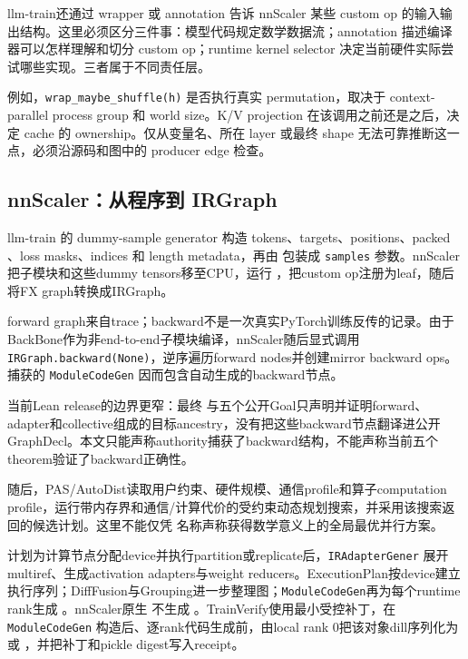 \documentclass[10.5pt,a4paper]{ctexart}
\newcommand{\code}[1]{\texttt{#1}}
\begin{document}
llm-train还通过 wrapper 或 annotation 告诉 nnScaler 某些 custom op 的输入输出结构。这里必须区分三件事：模型代码规定数学数据流；annotation 描述编译器可以怎样理解和切分 custom op；runtime kernel selector 决定当前硬件实际尝试哪些实现。三者属于不同责任层。

例如，\code{wrap\_maybe\_shuffle(h)} 是否执行真实 permutation，取决于 context-parallel process group 和 world size。K/V projection 在该调用之前还是之后，决定 cache 的 ownership。仅从变量名、所在 layer 或最终 shape 无法可靠推断这一点，必须沿源码和图中的 producer edge 检查。

\subsection{nnScaler：从程序到 IRGraph}

llm-train 的 dummy-sample generator 构造 tokens、targets、positions、packed 、loss masks、indices 和 length metadata，再由  包装成 \code{samples} 参数。nnScaler把子模块和这些dummy tensors移至CPU，运行 ，把custom op注册为leaf，随后将FX graph转换成IRGraph。

forward graph来自trace；backward不是一次真实PyTorch训练反传的记录。由于BackBone作为非end-to-end子模块编译，nnScaler随后显式调用 \code{IRGraph.backward(None)}，逆序遍历forward nodes并创建mirror backward ops。捕获的 \code{ModuleCodeGen} 因而包含自动生成的backward节点。

当前Lean release的边界更窄：最终  与五个公开Goal只声明并证明forward、adapter和collective组成的目标ancestry，没有把这些backward节点翻译进公开GraphDecl。本文只能声称authority捕获了backward结构，不能声称当前五个theorem验证了backward正确性。

随后，PAS/AutoDist读取用户约束、硬件规模、通信profile和算子computation profile，运行带内存界和通信/计算代价的受约束动态规划搜索，并采用该搜索返回的候选计划。这里不能仅凭  名称声称获得数学意义上的全局最优并行方案。

计划为计算节点分配device并执行partition或replicate后，\code{IRAdapterGener} 展开multiref、生成activation adapters与weight reducers。ExecutionPlan按device建立执行序列；DiffFusion与Grouping进一步整理图；\code{ModuleCodeGen}再为每个runtime rank生成 。nnScaler原生  不生成 。TrainVerify使用最小受控补丁，在 \code{ModuleCodeGen} 构造后、逐rank代码生成前，由local rank 0把该对象dill序列化为  或 ，并把补丁和pickle digest写入receipt。
\end{document}
